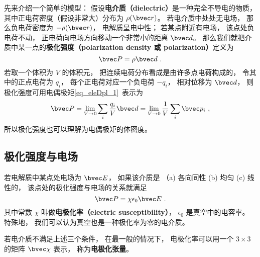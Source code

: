 

先来介绍一个简单的模型： 假设\textbf{电介质（dielectric）}是一种完全不导电的物质， 其中正电荷密度（假设非常大）分布为 $\rho(\bvec r)$。 若电介质中处处无电场， 那么负电荷密度为 $-\rho(\bvec r)$， 电解质呈电中性； 若某点附近有电场， 该点处负电荷不动， 正电荷向电场方向移动一个非常小的距离 $\bvec d$。 那么我们就把介质中某一点的\textbf{极化强度（polarization density 或 polarization）}定义为
\begin{equation}
\bvec P = \rho \bvec d~.
\end{equation}
若取一个体积为 $V$ 的体积元， 把连续电荷分布看成是由许多点电荷构成的， 令其中的正点电荷为 $q_i$， 每个正电荷对应一个负电荷 $-q_i$， 相对位移为 $\bvec d$， 则极化强度可用电偶极矩\autoref{eq_eleDpl_1}~表示为
\begin{equation}
\bvec P = \lim_{V\to 0}\sum_i \frac{q_i}{V} \bvec d = \lim_{V\to 0}\frac{1}{V} \sum_i \bvec p_i~,
\end{equation}
所以极化强度也可以理解为电偶极矩的体密度。

\subsection{极化强度与电场}
若电解质中某点处电场为 $\bvec E$， 如果该介质是 （a) 各向同性 (b) 均匀 (c) 线性的， 该点处的极化强度与电场的关系就满足
\begin{equation}
\bvec P = \chi \epsilon_0 \bvec E~.
\end{equation}
其中常数 $\chi$ 叫做\textbf{电极化率（electric susceptibility）}， $\epsilon_0$ 是真空中的电容率。 %
特殊地， 我们可以认为真空也是一种极化率为零的电介质。

若电介质不满足上述三个条件， 在最一般的情况下， 电极化率可以用一个 $3\times 3$ 的矩阵 $\bvec \chi$ 表示， 称为\textbf{电极化张量}。 %
